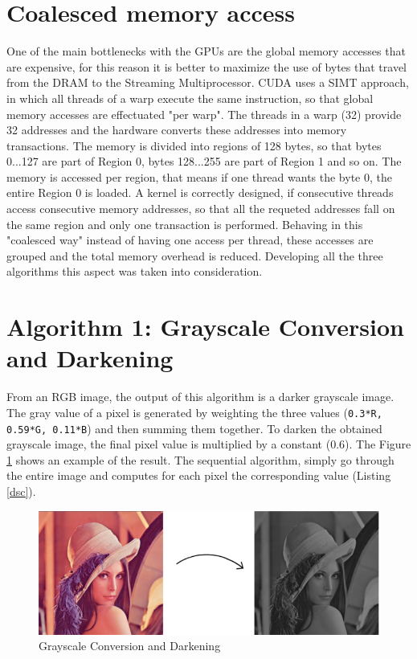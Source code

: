 \documentclass[a4paper]{article}
\begin{document}
\section{Coalesced memory access}
\label{sec:cma}
One of the main bottlenecks with the GPUs are the global memory accesses that are expensive, for this reason it is better to maximize the use of bytes that travel from the DRAM to the Streaming Multiprocessor. CUDA uses a SIMT approach, in which all threads of a warp execute the same instruction, so that global memory accesses are effectuated "per warp". The threads in a warp (32) provide 32 addresses and the hardware converts these addresses into memory transactions. The memory is divided into regions of 128 bytes, so that bytes 0...127 are part of Region 0, bytes 128...255 are part of Region 1 and so on. The memory is accessed per region, that means if one thread wants the byte 0, the entire Region 0 is loaded. A kernel is correctly designed, if consecutive threads access consecutive memory addresses, so that all the requeted addresses fall on the same region and only one transaction is performed. Behaving in this "coalesced way" instead of having one access per thread, these accesses are grouped and the total memory overhead is reduced. Developing all the three algorithms this aspect was taken into consideration.

\newpage

\section{Algorithm 1: Grayscale Conversion and Darkening}
\label{sec:gcd}
From an RGB image, the output of this algorithm is a darker grayscale image.
The gray value of a pixel is generated by weighting the three values (\texttt{0.3*R, 0.59*G, 0.11*B}) and then summing them together. To darken the obtained grayscale image, the final pixel value is multiplied by a constant (0.6). The Figure \ref{fig:dark} shows an example of the result. The sequential algorithm, simply go through the entire image and computes for each pixel the corresponding value (Listing \ref{dsc}).

\begin{figure}[!ht]
    \centering
    \includegraphics[width=0.7\linewidth]{dark}
    \caption{Grayscale Conversion and Darkening}
    \label{fig:dark}
\end{figure}
\FloatBarrier
\end{document}
